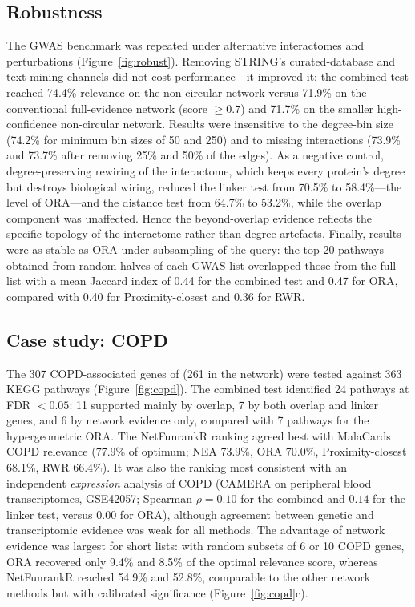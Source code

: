 \subsection{Robustness}\label{res:robust}
The GWAS benchmark was repeated under alternative interactomes and perturbations (Figure~\ref{fig:robust}). Removing STRING's curated-database and text-mining channels did not cost performance---it improved it: the combined test reached 74.4\% relevance on the non-circular network versus 71.9\% on the conventional full-evidence network (score $\ge 0.7$) and 71.7\% on the smaller high-confidence non-circular network. Results were insensitive to the degree-bin size (74.2\% for minimum bin sizes of 50 and 250) and to missing interactions (73.9\% and 73.7\% after removing 25\% and 50\% of the edges). As a negative control, degree-preserving rewiring of the interactome, which keeps every protein's degree but destroys biological wiring, reduced the linker test from 70.5\% to 58.4\%---the level of ORA---and the distance test from 64.7\% to 53.2\%, while the overlap component was unaffected. Hence the beyond-overlap evidence reflects the specific topology of the interactome rather than degree artefacts. Finally, results were as stable as ORA under subsampling of the query: the top-20 pathways obtained from random halves of each GWAS list overlapped those from the full list with a mean Jaccard index of 0.44 for the combined test and 0.47 for ORA, compared with 0.40 for Proximity-closest and 0.36 for RWR.

\subsection{Case study: COPD}\label{res:copd}
The 307 COPD-associated genes of \citet{MorselliGysi2021} (261 in the network) were tested against 363 KEGG pathways (Figure~\ref{fig:copd}). The combined test identified 24 pathways at FDR $<0.05$: 11 supported mainly by overlap, 7 by both overlap and linker genes, and 6 by network evidence only, compared with 7 pathways for the hypergeometric ORA. The NetFunrankR ranking agreed best with MalaCards COPD relevance (77.9\% of optimum; NEA 73.9\%, ORA 70.0\%, Proximity-closest 68.1\%, RWR 66.4\%). It was also the ranking most consistent with an independent \emph{expression} analysis of COPD (CAMERA on peripheral blood transcriptomes, GSE42057; Spearman $\rho = 0.10$ for the combined and $0.14$ for the linker test, versus $0.00$ for ORA), although agreement between genetic and transcriptomic evidence was weak for all methods. The advantage of network evidence was largest for short lists: with random subsets of 6 or 10 COPD genes, ORA recovered only 9.4\% and 8.5\% of the optimal relevance score, whereas NetFunrankR reached 54.9\% and 52.8\%, comparable to the other network methods but with calibrated significance (Figure~\ref{fig:copd}c).
